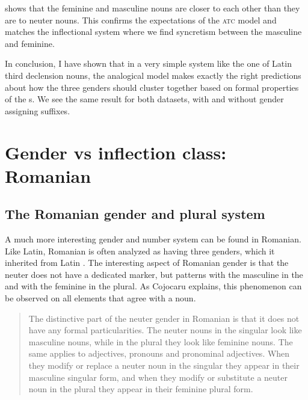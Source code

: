  shows that the feminine and masculine nouns are closer to each other than they are to neuter nouns. This confirms the expectations of the \textsc{atc} model and matches the inflectional system where we find syncretism between the masculine and feminine.

\largerpage 
In conclusion, I have shown that in a very simple system like the one of Latin third declension nouns, the analogical model makes exactly the right predictions about how the three genders should cluster together based on formal properties of the s. We see the same result for both datasets, with and without gender assigning suffixes.


\section{Gender vs inflection class: Romanian}

\subsection{The Romanian gender and plural system}


A much more interesting gender and number system can be found in Romanian. Like Latin, Romanian is often analyzed as having three genders, which it inherited from Latin \autocite[23]{Gonczol.2007}. The interesting aspect of Romanian gender is that the neuter does not have a dedicated marker, but patterns with the masculine in the  and with the feminine in the plural. As Cojocaru explains, this phenomenon can be observed on all elements that agree with a noun. 

\begin{quotation}
The distinctive part of the neuter gender in Romanian is that it does not have any formal particularities. The neuter nouns in the singular look like masculine nouns, while in the plural they look like feminine nouns. The same applies to adjectives, pronouns and pronominal adjectives. When they modify or replace a neuter noun in the singular they appear in their masculine singular form, and when they modify or substitute a neuter noun in the plural they appear in their feminine plural form. \autocite[27]{Cojocaru.2003}
\end{quotation}

